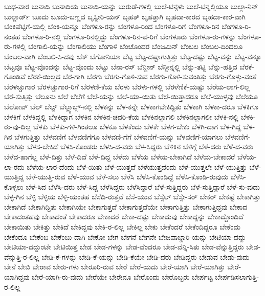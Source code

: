 {ಬುಧ-ವಾರ
ಬುನಾದಿ
ಬುನಾದಿಯ
ಬುನಾದಿ-ಯನ್ನು
ಬುರುಡೆ-ಗಳಲ್ಲಿ
ಬುಲೆ-ಟಿನ್ಗಳು
ಬುಲೆ-ಟಿನ್ನಲ್ಲಿಯೂ
ಬುಲ್ಗಾ-ನಿನ್
ಬುಲ್ಲಾರ್ಡ್
ಬೂದು
ಬೂದು-ಬಣ್ಣದ
ಬೃಸ್ಟೀರಿ-ಯನ್
ಬೃಹತ್
ಬೃಹತ್ತಾಗಿ
ಬೃಹದಾ-ಕಾರದ
ಬೃಹದಾ-ಕಾರ-ವಾಗಿ
ಬೆಂಕಿಪೆಟ್ಟಿಗೆ-ಯಲ್ಲಿ
ಬೆಂಕಿ-ಯನ್ನೂ
ಬೆಂಗಳೂ-ರನ್ನು
ಬೆಂಗಳೂ-ರಿಂದ
ಬೆಂಗಳೂ-ರಿಗೆ
ಬೆಂಗಳೂ-ರಿನ
ಬೆಂಗಳೂ-ರಿ-ನಂತಹ
ಬೆಂಗಳೂ-ರಿ-ನಲ್ಲಿ
ಬೆಂಗಳೂ-ರಿನಲ್ಲಿದ್ದು
ಬೆಂಗಳೂ-ರಿನ-ವ-ರಿಗೆ
ಬೆಂಗಳೂರು
ಬೆಂಗಳೂ-ರು-ಗಳನ್ನು
ಬೆಂಗಳೂ-ರು-ಗಳಲ್ಲಿ
ಬೆಂಗಾಲಿ-ಯನ್ನು
ಬೆಂಗಾಲಿಯು
ಬೆಂಗಾಳಿ
ಬೆಂಚೊಂದರ
ಬೆಂಜಮಿನ್
ಬೆಂಬಲ
ಬೆಂಬಲ-ದಿಂದಲೂ
ಬೆಂಬಲ-ವಾಗಿ
ಬೆಂಬಲಿ-ಸಿ-ದವು
ಬೆಕ್
ಬೆಗೋನಿಯಾ
ಬೆಟ್ಟ
ಬೆಟ್ಟ-ದಷ್ಟಾಗುತ್ತಿತ್ತು
ಬೆಟ್ಟ-ದಷ್ಟು
ಬೆಟ್ಟ-ವನ್ನು
ಬೆಟ್ಟ-ವನ್ನೂ
ಬೆಟ್ಟವೂ
ಬೆಟ್ಟ-ವೊಂದನ್ನು
ಬೆಟ್ಟ-ವೊಂದು
ಬೆಟ್ಟು
ಬೆನಾ-ರಸ್
ಬೆನ್ಜೀನ್
ಬೆನ್ಜೀನ್ನಲ್ಲಿ
ಬೆನ್ನು-ತಟ್ಟಿ
ಬೆನ್ನು-ಹತ್ತಿದ
ಬೆರಕೆ-ಗೊಂಡಿವೆ
ಬೆರಕೆ-ಯಿಲ್ಲದ
ಬೆರ-ಗಾಗಿ
ಬೆರಗು
ಬೆರಗು-ಗೊಳಿ-ಸುವ
ಬೆರಗು-ಗೊಳಿ-ಸುವಂತಿತ್ತು
ಬೆರಗು-ಗೊಳ್ಳು-ವಂತೆ
ಬೆರಳಚ್ಚುಗಾರ
ಬೆರಳಚ್ಚುಗಾರ-ರಿಗೆ
ಬೆರಳಣಿ-ಕೆಯ
ಬೆರಳು
ಬೆರಳು-ಗಳಲ್ಲಿ
ಬೆರಳೆಣಿಕೆ-ಯಷ್ಟು
ಬೆರೆಯ-ಲಾಗ-ಲಿಲ್ಲ
ಬೆರೆ-ಸುತ್ತಿತ್ತು
ಬೆಲೂನು
ಬೆಲೆ
ಬೆಲೆಗೆ
ಬೆಲೆ-ಯನ್ನು
ಬೆಲೆ-ಯಾ-ಯಿತು
ಬೆಲೆ-ಯಿತ್ತಾದರೂ
ಬೆಲೆ-ಯುಳ್ಳವು
ಬೆಲೆಯೂ
ಬೆಲೋವ್
ಬೆಲ್
ಬೆಲ್ಟ್
ಬೆಲ್ಲ್ಯಾಬ್ಸ್-ನಲ್ಲಿ
ಬೆಳಕನ್ನು
ಬೆಳ-ಕನ್ನೇ
ಬೆಳಕಾಗಬೇಕಿದ್ದಿತು
ಬೆಳಕಾಗಿ
ಬೆಳಕಾ-ದರೂ
ಬೆಳಕಿಗೂ
ಬೆಳಕಿಗೆ
ಬೆಳಕಿದ್ದಲ್ಲಿ
ಬೆಳಕಿದ್ದಾಗ
ಬೆಳಕಿನ
ಬೆಳಕಿನ-ಚದರಿ-ಕೆಯ
ಬೆಳಕಿನಲ್ಲಾಗಲಿ
ಬೆಳಕಿನಲ್ಲಾಗಲೀ
ಬೆಳಕಿ-ನಲ್ಲಿ
ಬೆಳಕಿ-ರು-ವು-ದಿಲ್ಲ
ಬೆಳಕು
ಬೆಳಕು-ಗಳಿ-ಗಿಂತಲೂ
ಬೆಳಕೂ
ಬೆಳಕೆಂದು
ಬೆಳಕೇ
ಬೆಳಗ-ಬೇಕು
ಬೆಳಗಿ-ದಾಗ
ಬೆಳ-ಗಿದ್ದ
ಬೆಳ-ಗಿನ
ಬೆಳಗುತ್ತಿತ್ತು
ಬೆಳವಣಿಗೆ
ಬೆಳವಣಿಗೆಗೂ
ಬೆಳವಣಿ-ಗೆಗೆ
ಬೆಳವಣಿಗೆ-ಯನ್ನು
ಬೆಳವಣಿಗೆ-ಯಾಗಲು
ಬೆಳವಣಿಗೆ-ಯಾಗಿತ್ತು
ಬೆಳಸ-ಬೇಕಿದೆ
ಬೆಳಸಿ-ಕೊಂಡರು
ಬೆಳಸಿ-ದ-ವರು
ಬೆಳ-ಸಿದ್ದರು
ಬೆಳಿಕಿನ
ಬೆಳಿಗ್ಗೆ
ಬೆಳೆ-ದರು
ಬೆಳೆ-ದ-ವರು
ಬೆಳೆದ-ಹಾಗೆಲ್ಲ
ಬೆಳೆ-ದಿತ್ತು
ಬೆಳೆ-ದಿದೆ
ಬೆಳೆ-ದಿದ್ದ
ಬೆಳೆದು
ಬೆಳೆಯ
ಬೆಳೆಯ-ಬೇಕಾಗಿದೆ
ಬೆಳೆಯ-ಬೇಕಾದರೆ
ಬೆಳೆಯ-ಲಾ-ರದು
ಬೆಳೆಯ-ಲಾರ-ದೆಂದು
ಬೆಳೆ-ಯಿತು
ಬೆಳೆ-ಯುತ್ತದೆ
ಬೆಳೆಯುತ್ತದೆಂದು
ಬೆಳೆ-ಯುತ್ತಲೇ
ಬೆಳೆ-ಯುತ್ತಿತ್ತು
ಬೆಳೆ-ಯುತ್ತಿದ್ದ
ಬೆಳೆ-ಯುತ್ತಿ-ರುವ
ಬೆಳೆ-ಯುವ
ಬೆಳೆ-ಸಲು
ಬೆಳೆಸಿ
ಬೆಳೆಸಿ-ಕೊಂಡಿದ್ದೆ
ಬೆಳೆಸಿ-ಕೊಂಡಿ-ರುವುದು
ಬೆಳೆಸಿ-ಕೊಳ್ಳಲು
ಬೆಳೆ-ಸಿದ
ಬೆಳೆಸಿ-ದರು
ಬೆಳೆ-ಸಿದ್ದ
ಬೆಳೆಸಿದ್ದರು
ಬೆಳೆಸಿದ್ದಾರೆ
ಬೆಳೆ-ಸುತ್ತಿದ್ದರು
ಬೆಳೆ-ಸುತ್ತಿದ್ದಾರೆ
ಬೆಳೆ-ಸು-ವುದು
ಬೆಳ್ಳ-ಗಿನ
ಬೆಳ್ಳಿ
ಬೆಳ್ಳಿಯ
ಬೆಳ್ಳಿ-ಯಂತಹ
ಬೆಸೆದಿ-ರುತ್ತವೆ
ಬೆಸೆ-ಯುವ
ಬೆಸ್ಸೆಲ್
ಬೆಸ್ಸೇ-ಸರ್
ಬೇಕರ್
ಬೇಕಷ್ಟೆ
ಬೇಕಾಗಿತ್ತು
ಬೇಕಾಗಿದೆ
ಬೇಕಾಗಿದ್ದಿತು
ಬೇಕಾಗಿಯೇ
ಬೇಕಾಗುತ್ತದೆ
ಬೇಕಾಗುತ್ತದೆಯೇ
ಬೇಕಾಗುತ್ತಿತ್ತು
ಬೇಕಾಗುತ್ತಿದ್ದವು
ಬೇಕಾದ
ಬೇಕಾದಂತಹವು
ಬೇಕಾದಂತೆ
ಬೇಕಾದರೂ
ಬೇಕಾದರೆ
ಬೇಕಾ-ದಷ್ಟು
ಬೇಕಾದುವು
ಬೇಕಾದ್ದನ್ನು
ಬೇಕಾದ್ದೊಂದಿದೆ
ಬೇಕಾಯಿತು
ಬೇಕಿತ್ತು
ಬೇಕಿದೆ
ಬೇಕಿದ್ದವು
ಬೇಕಿ-ರ-ಲಿಲ್ಲ
ಬೇಕಿಲ್ಲ
ಬೇಕು
ಬೇಕೆಂದರೆ
ಬೇಕೆಂದಿದ್ದರೂ
ಬೇಕೆಂದು
ಬೇಕೆಂದೂ
ಬೇಕೆಂಬ
ಬೇಕೆಂಬು-ದಾಗಿ
ಬೇಕೋ
ಬೇಗ
ಬೇಗನೆ
ಬೇಗನೇ
ಬೇಜವಾಬ್ದಾರಿ-ಯನ್ನು
ಬೇಟಿಯಾ-ದದ್ದು
ಬೇಟಿಯಾ-ದದ್ದುಂಟೇ
ಬೇಟಿಯಿತ್ತ
ಬೇಡ
ಬೇಡ-ಗಳನ್ನು
ಬೇಡ-ವೆಂದರೂ
ಬೇಡ-ವೆನ್ನಿ-ಸಿತು
ಬೇಡ-ವೆನ್ನುತ್ತಿದ್ದರು
ಬೇಡ-ವೆನ್ನುತ್ತಿ-ರ-ಲಿಲ್ಲ
ಬೇಡಿ-ಕೆ-ಗಳನ್ನು
ಬೇಡಿ-ಕೆ-ಯನ್ನು
ಬೇಡಿ-ಕೆಯೇ
ಬೇಡಿ-ದರು
ಬೇಡಿದ್ದರು
ಬೇಡುವ
ಬೇಡು-ವುದು
ಬೇನೆ
ಬೇಬಿ
ಬೇರಾವ
ಬೇರು-ಗಳು
ಬೇರೂರಿ-ರುವ
ಬೇರೆ
ಬೇರೆ-ಯದು
ಬೇರೆ-ಯಾಗಿ
ಬೇರೆ-ಯಾಗಿತ್ತು
ಬೇರೆ-ಯಾಗಿದ್ದವು
ಬೇರೆ-ಯಾಗಿ-ರು-ವುದು
ಬೇರೆಯೇ
ಬೇರೇನೂ
ಬೇರೊಂದು
ಬೇರೊಬ್ಬರು
ಬೇರ್ಪಟ್ಟ
ಬೇರ್ಪಡಿಸಲಾಗುತ್ತಿ-ರ-ಲಿಲ್ಲ
}
